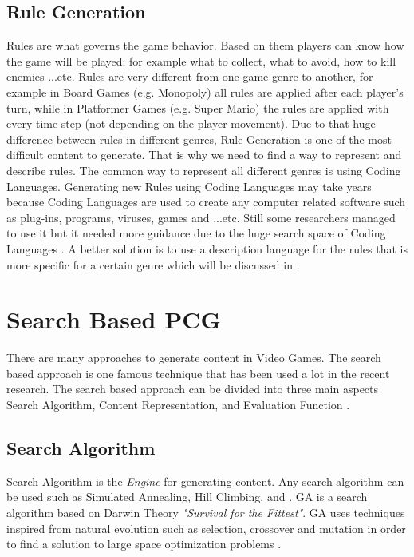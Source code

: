 \subsection{Rule Generation}
Rules are what governs the game behavior. Based on them players can know how the game will be played; for example what to collect, what to avoid, how to kill enemies ...etc. Rules are very different from one game genre to another, for example in Board Games (e.g. Monopoly) all rules are applied after each player's turn, while in Platformer Games (e.g. Super Mario) the rules are applied with every time step (not depending on the player movement). Due to that huge difference between rules in different genres, Rule Generation is one of the most difficult content to generate. That is why we need to find a way to represent and describe rules. The common way to represent all different genres is using Coding Languages. Generating new Rules using Coding Languages may take years because Coding Languages are used to create any computer related software such as plug-ins, programs, viruses, games and ...etc. Still some researchers managed to use it but it needed more guidance due to the huge search space of Coding Languages \cite{mechanicMiner}. A better solution is to use a description language for the rules that is more specific for a certain genre which will be discussed in  \cite{pcgBookRules}.
 
\section{Search Based PCG}
There are many approaches to generate content in Video Games. The search based approach is one famous technique that has been used a lot in the recent research. The search based approach can be divided into three main aspects Search Algorithm, Content Representation, and Evaluation Function \cite{pcgBookSearch}.

\subsection{Search Algorithm}
Search Algorithm is the \emph{Engine} for generating content. Any search algorithm can be used such as Simulated Annealing, Hill Climbing, and . GA is a search algorithm based on Darwin Theory \textit{"Survival for the Fittest"}. GA uses techniques inspired from natural evolution such as selection, crossover and mutation in order to find a solution to large space optimization problems \cite{geneticAlgorithm}.

